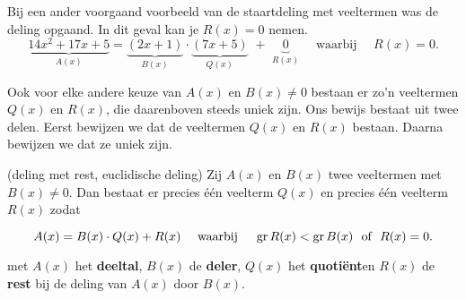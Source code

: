 \documentclass{ximera}
\begin{document}
Bij een ander voorgaand voorbeeld van de staartdeling met veeltermen was de deling opgaand. In dit geval kan je \( R(x) = 0\) nemen. 
\[
\underbrace{14x^2+17x+5}_{A(x)} = \underbrace{(2x+1)}_{B(x)}\cdot\underbrace{(7x+5)}_{Q(x)} \,\, + \,\, \underbrace{0}_{R(x)} \quad \text{ waarbij } \quad R(x) = 0.
\]

Ook voor elke andere keuze van \(A(x)\) en \(B(x) \neq 0\) bestaan er zo'n veeltermen \(Q(x)\) en \(R(x)\), die daarenboven steeds uniek zijn. Ons bewijs bestaat uit twee delen. Eerst bewijzen we dat de veeltermen \(Q(x)\) en \(R(x)\) bestaan. Daarna bewijzen we dat ze uniek zijn. 








\begin{theorem}(deling met rest, euclidische deling)
Zij \(A(x)\) en \(B(x)\) twee veeltermen met \(B(x) \neq 0\). Dan bestaat er precies één veelterm \(Q(x)\) en precies één veelterm \(R(x)\) zodat

\begin{equation}
A(x) = B(x)\cdot Q(x) + R(x) \quad \text{ waarbij } \quad \operatorname{gr} R(x) < \operatorname{gr} B(x) \,\, \text{ of } \,\, R(x) = 0.
\end{equation}

met \(A(x)\) het \textbf{deeltal}, \(B(x)\) de \textbf{deler}, \(Q(x)\) het \textbf{quotiënt}en \(R(x)\) de \textbf{rest} bij de deling van \(A(x)\) door \(B(x)\). 
\end{theorem} 
\end{document}
